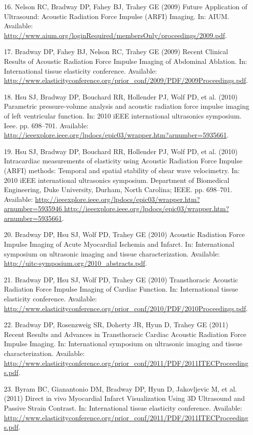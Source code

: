 \documentclass[]{article}
\begin{document}
16. Nelson RC, Bradway DP, Fahey BJ, Trahey GE (2009) Future Application
of Ultrasound: Acoustic Radiation Force Impulse (ARFI) Imaging. In:
AIUM. Available:
\url{http://www.aium.org/loginRequired/membersOnly/proceedings/2009.pdf}.

17. Bradway DP, Fahey BJ, Nelson RC, Trahey GE (2009) Recent Clinical
Results of Acoustic Radiation Force Impulse Imaging of Abdominal
Ablation. In: International tissue elasticity conference. Available:
\url{http://www.elasticityconference.org/prior_conf/2009/PDF/2009Proceedings.pdf}.

18. Hsu SJ, Bradway DP, Bouchard RR, Hollender PJ, Wolf PD, et al.
(2010) Parametric pressure-volume analysis and acoustic radiation force
impulse imaging of left ventricular function. In: 2010 iEEE
international ultrasonics symposium. Ieee. pp. 698--701. Available:
\url{http://ieeexplore.ieee.org/lpdocs/epic03/wrapper.htm?arnumber=5935661}.

19. Hsu SJ, Bradway DP, Bouchard RR, Hollender PJ, Wolf PD, et al.
(2010) Intracardiac measurements of elasticity using Acoustic Radiation
Force Impulse (ARFI) methods: Temporal and spatial stability of shear
wave velocimetry. In: 2010 iEEE international ultrasonics symposium.
Department of Biomedical Engineering, Duke University, Durham, North
Carolina; IEEE. pp. 698--701. Available:
\url{http://ieeexplore.ieee.org/lpdocs/epic03/wrapper.htm?arnumber=5935946 http://ieeexplore.ieee.org/lpdocs/epic03/wrapper.htm?arnumber=5935661}.

20. Bradway DP, Hsu SJ, Wolf PD, Trahey GE (2010) Acoustic Radiation
Force Impulse Imaging of Acute Myocardial Ischemia and Infarct. In:
International symposium on ultrasonic imaging and tissue
characterization. Available:
\url{http://uitc-symposium.org/2010_abstracts.pdf}.

21. Bradway DP, Hsu SJ, Wolf PD, Trahey GE (2010) Transthoracic Acoustic
Radiation Force Impulse Imaging of Cardiac Function. In: International
tissue elasticity conference. Available:
\url{http://www.elasticityconference.org/prior_conf/2010/PDF/2010Proceedings.pdf}.

22. Bradway DP, Rosenzweig SR, Doherty JR, Hyun D, Trahey GE (2011)
Recent Results and Advances in Transthoracic Cardiac Acoustic Radiation
Force Impulse Imaging. In: International symposium on ultrasonic imaging
and tissue characterization. Available:
\url{http://www.elasticityconference.org/prior_conf/2011/PDF/2011ITECProceedings.pdf}.

23. Byram BC, Gianantonio DM, Bradway DP, Hyun D, Jakovljevic M, et al.
(2011) Direct in vivo Myocardial Infarct Visualization Using 3D
Ultrasound and Passive Strain Contrast. In: International tissue
elasticity conference. Available:
\url{http://www.elasticityconference.org/prior_conf/2011/PDF/2011ITECProceedings.pdf}.
\end{document}
